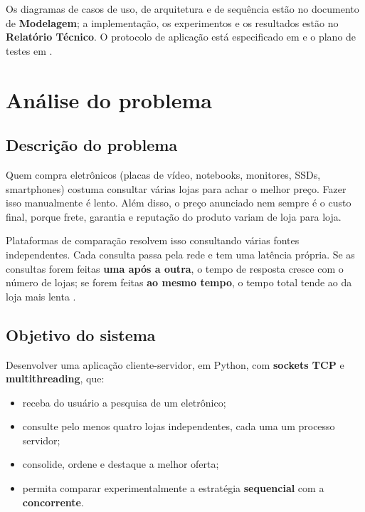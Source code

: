 Os diagramas de casos de uso, de arquitetura e de sequência estão no documento de \textbf{Modelagem}; a implementação, os experimentos e os resultados estão no \textbf{Relatório Técnico}. O protocolo de aplicação está especificado em  e o plano de testes em .

\chapter{Análise do problema}

\section{Descrição do problema}

Quem compra eletrônicos (placas de vídeo, notebooks, monitores, SSDs, smartphones) costuma consultar várias lojas para achar o melhor preço. Fazer isso manualmente é lento. Além disso, o preço anunciado nem sempre é o custo final, porque frete, garantia e reputação do produto variam de loja para loja.

Plataformas de comparação resolvem isso consultando várias fontes independentes. Cada consulta passa pela rede e tem uma latência própria. Se as consultas forem feitas \textbf{uma após a outra}, o tempo de resposta cresce com o número de lojas; se forem feitas \textbf{ao mesmo tempo}, o tempo total tende ao da loja mais lenta \cite{tanenbaum2007}.

\section{Objetivo do sistema}

Desenvolver uma aplicação cliente-servidor, em Python, com \textbf{sockets TCP} e \textbf{multithreading}, que:

\begin{itemize}
  \item receba do usuário a pesquisa de um eletrônico;
  \item consulte pelo menos quatro lojas independentes, cada uma um processo servidor;
  \item consolide, ordene e destaque a melhor oferta;
  \item permita comparar experimentalmente a estratégia \textbf{sequencial} com a \textbf{concorrente}.
\end{itemize}

